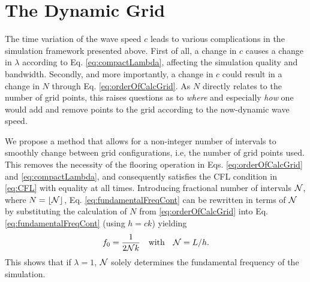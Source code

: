 \section{The Dynamic Grid}\label{sec:dynamicGrid}
The time variation of the wave speed $c$ leads to various complications in the simulation framework presented above. First of all, a change in $c$ causes a change in $\lambda$ according to Eq. \eqref{eq:compactLambda}, affecting the simulation quality and bandwidth. Secondly, and more importantly, a change in $c$ could result in a change in $N$ through Eq. \eqref{eq:orderOfCalcGrid}. As $N$ directly relates to the number of grid points, this raises questions as to \textit{where} and especially \textit{how} one would add and remove points to the grid according to the now-dynamic wave speed.

We propose a method that allows for a non-integer number of intervals to smoothly change between grid configurations, i.e, the number of grid points used. This removes the necessity of the flooring operation in Eqs. \eqref{eq:orderOfCalcGrid} and \eqref{eq:compactLambda}, and consequently satisfies the CFL condition in \eqref{eq:CFL} with equality at all times. Introducing fractional number of intervals $\mathcal{N}$, where $N = \lfloor \mathcal{N}\rfloor$, Eq. \eqref{eq:fundamentalFreqCont} can be rewritten in terms of $\mathcal{N}$ by substituting the calculation of $N$ from \eqref{eq:orderOfCalcGrid} into Eq. \eqref{eq:fundamentalFreqCont} (using $h=ck$) yielding
\begin{equation}\label{eq:fundamentalFreq}
    f_0 = \frac{1}{2\mathcal{N} k}\quad \text{with}\quad \mathcal{N} = L/h.
\end{equation}
This shows that if $\lambda = 1$, $\mathcal{N}$ solely determines the fundamental frequency of the simulation. 


